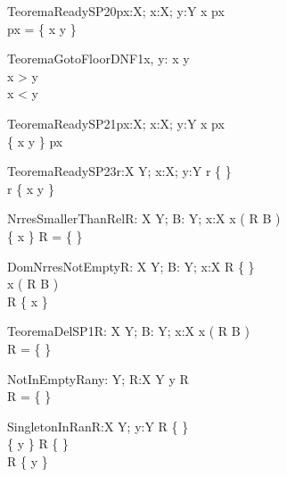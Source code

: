 \begin{theorem}{TeoremaReadySP20}{px:\power X; x:X; y:Y}
x \notin px \\
px = \dom \{ x \mapsto y \}
\end{theorem}

\begin{theorem}{TeoremaGotoFloorDNF1}{x, y: \nat}
x \neq y \\
\lnot x > y \\
\lnot x < y
\end{theorem}

\begin{theorem}{TeoremaReadySP21}{px:\power X; x:X; y:Y}
x \notin px \\
\dom \{ x \mapsto y \} \subset px
\end{theorem}

\begin{theorem}{TeoremaReadySP23}{r:X \rel Y; x:X; y:Y}
r \neq \{ \} \\
\dom r \subset \dom \{ x \mapsto y \}
\end{theorem}

\begin{theorem}{NrresSmallerThanRel}{R: X \rel Y; B: \power Y; x:X}
x \in \dom ( R \nrres B ) \\
\{ x \} \cap \dom R = \{ \}
\end{theorem}

\begin{theorem}{DomNrresNotEmpty}{R: X \rel Y; B: \power Y; x:X}
R \neq \{ \} \\
x \in \dom ( R \nrres B ) \\
\dom R \subset \{ x \}
\end{theorem}

\begin{theorem}{TeoremaDelSP1}{R: X \rel Y; B: \power Y; x:X}
x \in \dom ( R \nrres B ) \\
R = \{ \}
\end{theorem}

\begin{theorem}{NotInEmptyRan}{y: Y; R:X \rel Y}
y \in \ran R \\
R = \{ \}
\end{theorem}

\begin{theorem}{SingletonInRan}{R:X \rel Y; y:Y}
R \neq \{ \} \\
\{ y \} \cap \ran R \neq \{ \} \\
\ran R \subset \{ y \} 
\end{theorem}

